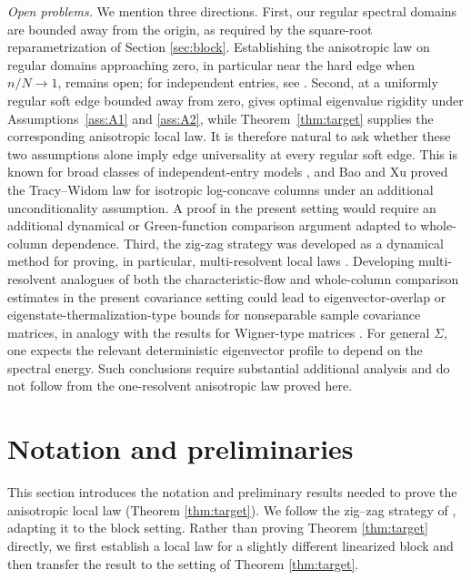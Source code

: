 \documentclass[11pt,reqno]{amsart}
\theoremstyle{definition}
\numberwithin{equation}{section}
\numberwithin{figure}{section}
\begin{document}
\medskip
\noindent\emph{Open problems.}
We mention three directions. First, our regular spectral domains are bounded away from the origin, as required by the square-root reparametrization of Section \ref{sec:block}. Establishing the anisotropic law on regular domains approaching zero, in particular near the hard edge when $n/N \to 1$, remains open; for independent entries, see \cite{cacciapuoti2013local,bloemendal2014isotropic}.  Second, at a uniformly regular soft edge bounded away from zero, \cite[Corollary~2.7]{fan2026anisotropic} gives optimal eigenvalue rigidity under Assumptions~\ref{ass:A1} and \ref{ass:A2}, while Theorem~\ref{thm:target} supplies the corresponding anisotropic local law. It is therefore natural to ask whether these two assumptions alone imply edge universality at every 
regular soft edge. This is known for broad classes of independent-entry models \cite{bao2015universality,lee2016tracy,knowles2017anisotropic,ding2018necessary,fan2022tracy}, and Bao and Xu \cite{bao2025extreme} proved the Tracy--Widom law for isotropic log-concave columns under an additional unconditionality assumption. A proof in the present setting would require an additional dynamical or Green-function comparison argument adapted to whole-column dependence. Third, the zig-zag strategy was developed as a dynamical method for proving, in particular, multi-resolvent local laws \cite{cipolloni2022mesoscopic,erdos2025lecture}. Developing multi-resolvent analogues of both the characteristic-flow and whole-column comparison estimates in the present covariance setting could lead to eigenvector-overlap or eigenstate-thermalization-type bounds for nonseparable sample covariance matrices, in analogy with the results for Wigner-type matrices \cite{cipolloni2023edge,erdos2024eigenstate}. For general $\Sigma$, one expects the relevant deterministic eigenvector profile to depend on the spectral energy. Such conclusions require substantial additional analysis and do not follow from the one-resolvent anisotropic law proved here.





\section{Notation and preliminaries}\label{sec:prelim}
This section introduces the notation and preliminary results needed to prove the anisotropic local law (Theorem \ref{thm:target}). We follow the zig--zag strategy of \cite{cipolloni2022mesoscopic,erdos2025lecture}, adapting it to the block setting. Rather than proving Theorem \ref{thm:target} directly, we first establish a local law for a slightly different linearized block and then transfer the result to the setting of Theorem \ref{thm:target}.
\end{document}
